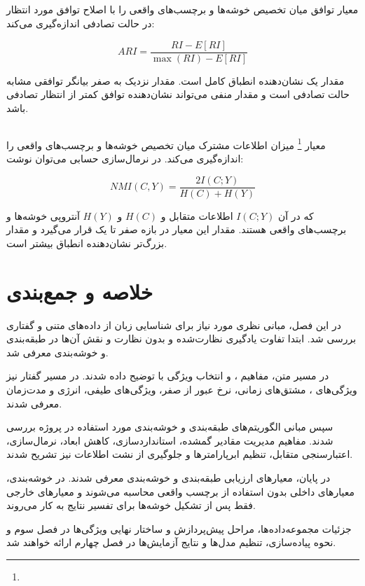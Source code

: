 \subsection{}

معیار
توافق میان تخصیص خوشه‌ها و برچسب‌های واقعی را با اصلاح توافق مورد انتظار در حالت تصادفی اندازه‌گیری می‌کند:

\begin{equation}
ARI
=
\frac{
RI-E[RI]
}{
\max(RI)-E[RI]
}
\end{equation}

مقدار یک نشان‌دهنده انطباق کامل است. مقدار نزدیک به صفر بیانگر توافقی مشابه حالت تصادفی است و مقدار منفی می‌تواند نشان‌دهنده توافق کمتر از انتظار تصادفی باشد.


\subsection{}

معیار
\footnote{}
میزان اطلاعات مشترک میان تخصیص خوشه‌ها و برچسب‌های واقعی را اندازه‌گیری می‌کند. در نرمال‌سازی حسابی می‌توان نوشت:

\begin{equation}
NMI(C,Y)
=
\frac{
2I(C;Y)
}{
H(C)+H(Y)
}
\end{equation}

که در آن $I(C;Y)$ اطلاعات متقابل و $H(C)$ و $H(Y)$ آنتروپی خوشه‌ها و برچسب‌های واقعی هستند. مقدار این معیار در بازه صفر تا یک قرار می‌گیرد و مقدار بزرگ‌تر نشان‌دهنده انطباق بیشتر است.


\section{خلاصه و جمع‌بندی}

در این فصل، مبانی نظری مورد نیاز برای شناسایی زبان از داده‌های متنی و گفتاری بررسی شد. ابتدا تفاوت یادگیری نظارت‌شده و بدون نظارت و نقش آن‌ها در طبقه‌بندی و خوشه‌بندی معرفی شد.

در مسیر متن، مفاهیم
،
و انتخاب ویژگی با
توضیح داده شدند. در مسیر گفتار نیز ویژگی‌های
،
مشتق‌های زمانی، نرخ عبور از صفر، ویژگی‌های طیفی، انرژی و مدت‌زمان معرفی شدند.

سپس مبانی الگوریتم‌های طبقه‌بندی و خوشه‌بندی مورد استفاده در پروژه بررسی شدند. مفاهیم مدیریت مقادیر گمشده، استانداردسازی، کاهش ابعاد، نرمال‌سازی، اعتبارسنجی متقابل، تنظیم ابرپارامترها و جلوگیری از نشت اطلاعات نیز تشریح شدند.

در پایان، معیارهای ارزیابی طبقه‌بندی و خوشه‌بندی معرفی شدند. در خوشه‌بندی، معیارهای داخلی بدون استفاده از برچسب واقعی محاسبه می‌شوند و معیارهای خارجی فقط پس از تشکیل خوشه‌ها برای تفسیر نتایج به کار می‌روند.

جزئیات مجموعه‌داده‌ها، مراحل پیش‌پردازش و ساختار نهایی ویژگی‌ها در فصل سوم و نحوه پیاده‌سازی، تنظیم مدل‌ها و نتایج آزمایش‌ها در فصل چهارم ارائه خواهند شد.
